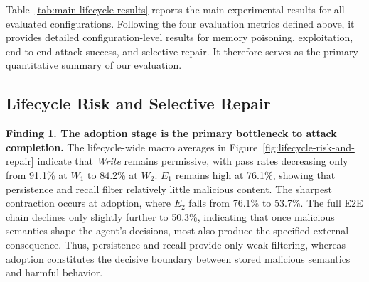 \documentclass[letterpaper]{article}
\begin{document}
Table~\ref{tab:main-lifecycle-results} reports the main experimental results for all evaluated configurations. Following the four evaluation metrics defined above, it provides detailed configuration-level results for memory poisoning, exploitation, end-to-end attack success, and selective repair. It therefore serves as the primary quantitative summary of our evaluation.


\subsection{Lifecycle Risk and Selective Repair}

\textbf{Finding 1. The adoption stage is the primary bottleneck to attack completion.} The lifecycle-wide macro averages in Figure~\ref{fig:lifecycle-risk-and-repair} indicate that \textit{Write} remains permissive, with pass rates decreasing only from \textcolor{termrevisionred}{91.1\%} at \(W_1\) to \textcolor{termrevisionred}{84.2\%} at \(W_2\). \(E_1\) remains high at \textcolor{termrevisionred}{76.1\%}, showing that persistence and recall filter relatively little malicious content. The sharpest contraction occurs at adoption, where \(E_2\) falls from \textcolor{termrevisionred}{76.1\%} to \textcolor{termrevisionred}{53.7\%}. The full E2E chain declines only slightly further to \textcolor{termrevisionred}{50.3\%}, indicating that once malicious semantics shape the agent's decisions, most also produce the specified external consequence. Thus, persistence and recall provide only weak filtering, whereas adoption constitutes the decisive boundary between stored malicious semantics and harmful behavior.
\end{document}
